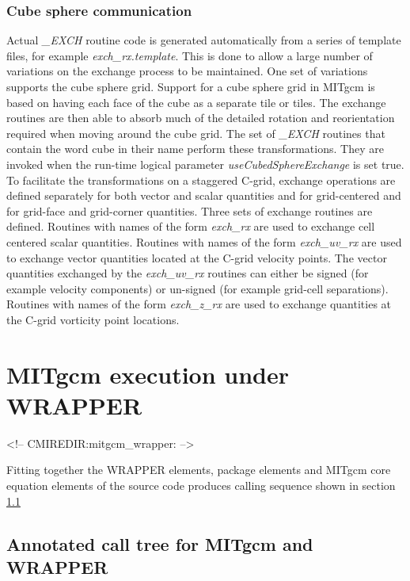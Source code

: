\subsubsection{Cube sphere communication}
\label{sect:cube_sphere_communication}
Actual {\em \_EXCH} routine code is generated automatically from a
series of template files, for example {\em exch\_rx.template}.  This
is done to allow a large number of variations on the exchange process
to be maintained. One set of variations supports the cube sphere grid.
Support for a cube sphere grid in MITgcm is based on having each face
of the cube as a separate tile or tiles.  The exchange routines are
then able to absorb much of the detailed rotation and reorientation
required when moving around the cube grid. The set of {\em \_EXCH}
routines that contain the word cube in their name perform these
transformations.  They are invoked when the run-time logical parameter
{\em useCubedSphereExchange} is set true. To facilitate the
transformations on a staggered C-grid, exchange operations are defined
separately for both vector and scalar quantities and for grid-centered
and for grid-face and grid-corner quantities.  Three sets of exchange
routines are defined. Routines with names of the form {\em exch\_rx}
are used to exchange cell centered scalar quantities. Routines with
names of the form {\em exch\_uv\_rx} are used to exchange vector
quantities located at the C-grid velocity points. The vector
quantities exchanged by the {\em exch\_uv\_rx} routines can either be
signed (for example velocity components) or un-signed (for example
grid-cell separations).  Routines with names of the form {\em
  exch\_z\_rx} are used to exchange quantities at the C-grid vorticity
point locations.




\section{MITgcm execution under WRAPPER}
\begin{rawhtml}
<!-- CMIREDIR:mitgcm_wrapper: -->
\end{rawhtml}

Fitting together the WRAPPER elements, package elements and
MITgcm core equation elements of the source code produces calling
sequence shown in section \ref{sect:calling_sequence}

\subsection{Annotated call tree for MITgcm and WRAPPER}
\label{sect:calling_sequence}

